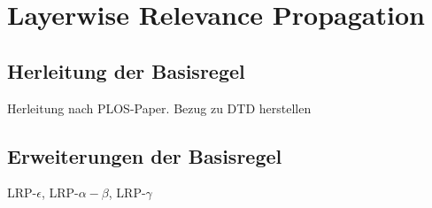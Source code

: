 \chapter{Layerwise Relevance Propagation}
\section{Herleitung der Basisregel}
Herleitung nach PLOS-Paper. Bezug zu DTD herstellen
\section{Erweiterungen der Basisregel}
LRP-$\epsilon$, LRP-$\alpha-\beta$, LRP-$\gamma$